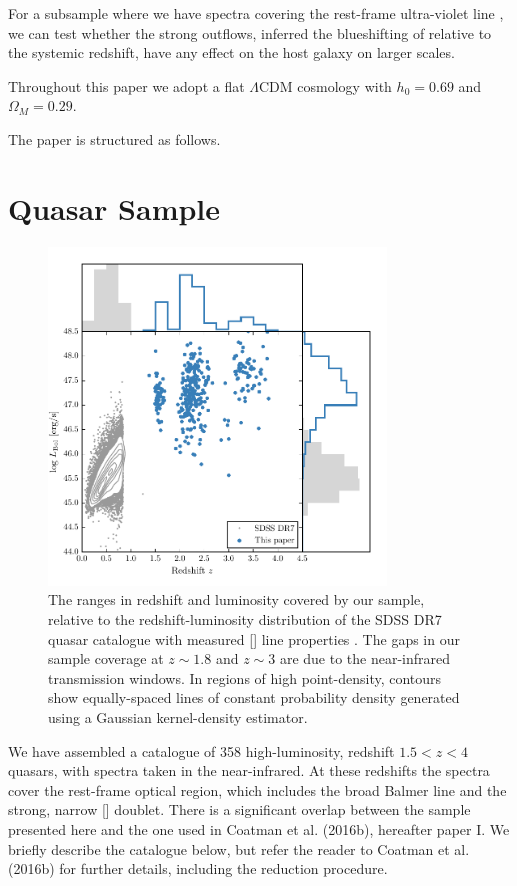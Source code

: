 For a subsample where we have spectra covering the rest-frame ultra-violet line , we can test whether the strong outflows, inferred the blueshifting of  relative to the systemic redshift, have any effect on the host galaxy on larger scales. 

Throughout this paper we adopt a flat $\Lambda$CDM cosmology with $h_0=0.69$ and $\Omega_M=0.29$. 

The paper is structured as follows. 

\section{Quasar Sample}

\begin{figure}
    \includegraphics[width=0.8\textwidth]{figures/chapter04/luminosity_z.pdf} 
    \caption{The ranges in redshift and luminosity covered by our sample, relative to the redshift-luminosity distribution of the SDSS DR7 quasar catalogue with measured [] line properties \citep{shen11}. The gaps in our sample coverage at $z\sim1.8$ and $z\sim3$ are due to the near-infrared transmission windows. In regions of high point-density, contours show equally-spaced lines of constant probability density generated using a Gaussian kernel-density estimator.}     
    \label{fig:lzplane}
\end{figure}

We have assembled a catalogue of 358 high-luminosity, redshift $1.5 < z < 4$ quasars, with spectra taken in the near-infrared.
At these redshifts the spectra cover the rest-frame optical region, which includes the broad Balmer \hb line and the strong, narrow [] doublet. 
There is a significant overlap between the sample presented here and the one used in Coatman et al. (2016b), hereafter paper I.  
We briefly describe the catalogue below, but refer the reader to Coatman et al. (2016b) for further details, including the reduction procedure.  


